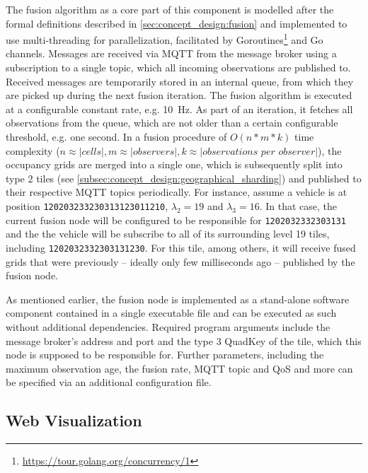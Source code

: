 The fusion algorithm as a core part of this component is modelled after the formal definitions described in \cref{sec:concept_design:fusion} and implemented to use multi-threading for parallelization, facilitated by Goroutines\footnote{\url{https://tour.golang.org/concurrency/1}} and Go channels. Messages are received via MQTT from the message broker using a subscription to a single topic, which all incoming observations are published to. Received messages are temporarily stored in an internal queue, from which they are picked up during the next fusion iteration. The fusion algorithm is executed at a configurable constant rate, e.g. \SI{10}{\hertz}. As part of an iteration, it fetches all observations from the queue, which are not older than a certain configurable threshold, e.g. one second. In a fusion procedure of $O(n*m*k)$ time complexity ($n \approx |\textit{cells}|, m \approx |\textit{observers}|, k \approx |\textit{observations per observer}|$), the occupancy grids are merged into a single one, which is subsequently split into type 2 tiles (see \cref{subsec:concept_design:geographical_sharding}) and published to their respective MQTT topics periodically. For instance, assume a vehicle is at position \texttt{120203233230313123011210}, $\lambda_2 = 19$ and $\lambda_3 = 16$. In that case, the current fusion node will be configured to be responsible for \texttt{1202032332303131} and the the vehicle will be subscribe to all of its surrounding level 19 tiles, including \texttt{1202032332303131230}. For this tile, among others, it will receive fused grids that were previously – ideally only few milliseconds ago – published by the fusion node.
\par
\bigskip

As mentioned earlier, the fusion node is implemented as a stand-alone software component contained in a single executable file and can be executed as such without additional dependencies. Required program arguments include the message broker's address and port and the type 3 QuadKey of the tile, which this node is supposed to be responsible for. Further parameters, including the maximum observation age, the fusion rate, MQTT topic and QoS and more can be specified via an additional configuration file.

\subsection{Web Visualization}
\label{subsec:implementation:web_visualization}

